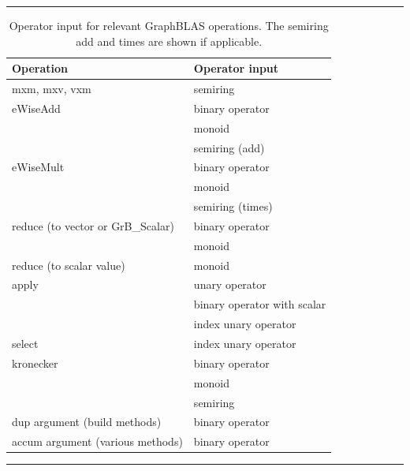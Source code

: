 \begin{table}[t]
    \hrule
    \begin{center}
        \caption[Operator input for relevant GraphBLAS operations.]{Operator input for relevant GraphBLAS operations. 
        The semiring add and times are shown if applicable.}
        \label{Tab:OperatorInputType}
        \begin{tabular}{l|l}
        Operation                       & Operator input        \\ \hline
        {\sf mxm, mxv, vxm}             & semiring              \\ \hline
        {\sf eWiseAdd}                  & binary operator       \\
                                        & monoid                \\
                                        & semiring (add)        \\ \hline
        {\sf eWiseMult}                 & binary operator       \\
                                        & monoid                \\
                                        & semiring (times)      \\ \hline
       {\sf reduce} (to vector or {\sf GrB\_Scalar})  & binary operator    \\ 
                                        & monoid                \\ \hline
       {\sf reduce} (to scalar value)   & monoid                \\ \hline
       {\sf apply}                      & unary operator        \\
	                                    & binary operator with scalar \\
                                        & index unary operator  \\ \hline
       {\sf select}                     & index unary operator  \\ \hline
       {\sf kronecker}                  & binary operator       \\
                                        & monoid                \\
                                        & semiring              \\ \hline
       {\sf dup} argument (build methods)     & binary operator \\ \hline
       {\sf accum} argument (various methods) & binary operator \\
       \end{tabular}
    \end{center}
    \hrule
\end{table}

